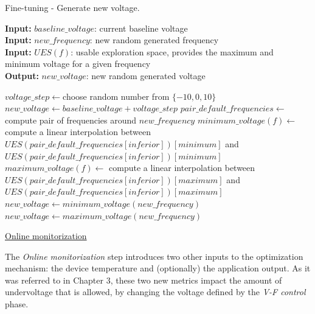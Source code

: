 \begin{algorithm}[h]
\caption{Fine-tuning - Generate new voltage.}
    \label{alg:fine-voltage} 
    \hspace*{\algorithmicindent} \textbf{Input:} $baseline\_voltage$: current baseline voltage \\
 \hspace*{\algorithmicindent} \textbf{Input:} $new\_frequency$: new random generated frequency \\
 \hspace*{\algorithmicindent} \textbf{Input:} $UES(f)$: usable exploration space, provides the maximum and minimum voltage for a given frequency \\
 \hspace*{\algorithmicindent} \textbf{Output:} $new\_voltage$: new random generated voltage
\begin{algorithmic}
\STATE $voltage\_step \leftarrow $choose random number from $\{-10,0, 10\}$
\STATE $new\_voltage \leftarrow baseline\_voltage + voltage\_step$
\STATE $pair\_default\_frequencies \leftarrow $ compute pair of frequencies around $new\_frequency$
\STATE $minimum\_voltage(f) \leftarrow$ compute a linear interpolation between\\ 
\hspace*{\algorithmicindent}$UES(pair\_default\_frequencies[inferior])[minimum]$ and\\
\hspace*{\algorithmicindent}$UES(pair\_default\_frequencies[inferior])[minimum]$
\STATE $maximum\_voltage(f) \leftarrow$ compute a linear interpolation between\\
\hspace*{\algorithmicindent}$UES(pair\_default\_frequencies[inferior])[maximum]$ and\\
\hspace*{\algorithmicindent}$UES(pair\_default\_frequencies[inferior])[maximum]$
\STATE $new\_voltage \leftarrow minimum\_voltage(new\_frequency)$
\STATE $new\_voltage \leftarrow maximum\_voltage(new\_frequency)$
\ENDIF
\end{algorithmic}
\end{algorithm}

\bigskip
\noindent\underline{Online monitorization}
\bigskip

The \textit{Online monitorization} step introduces two other inputs to the optimization mechanism: the device temperature and (optionally) the application output. As it was referred to in Chapter 3, these two new metrics impact the amount of undervoltage that is allowed, by changing the voltage defined by the \textit{V-F control} phase. 

